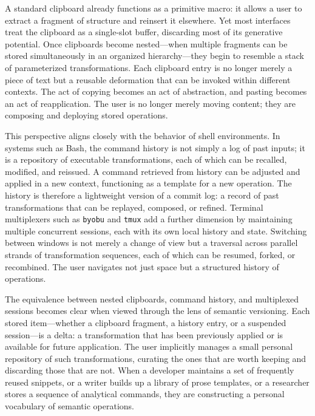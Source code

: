 \documentclass[12pt, letterpaper]{article}
\begin{document}
A standard clipboard already functions as a primitive macro: it allows a user to extract a fragment of structure and reinsert it elsewhere. Yet most interfaces treat the clipboard as a single-slot buffer, discarding most of its generative potential. Once clipboards become nested---when multiple fragments can be stored simultaneously in an organized hierarchy---they begin to resemble a stack of parameterized transformations. Each clipboard entry is no longer merely a piece of text but a reusable deformation that can be invoked within different contexts. The act of copying becomes an act of abstraction, and pasting becomes an act of reapplication. The user is no longer merely moving content; they are composing and deploying stored operations.

This perspective aligns closely with the behavior of shell environments. In systems such as Bash, the command history is not simply a log of past inputs; it is a repository of executable transformations, each of which can be recalled, modified, and reissued. A command retrieved from history can be adjusted and applied in a new context, functioning as a template for a new operation. The history is therefore a lightweight version of a commit log: a record of past transformations that can be replayed, composed, or refined. Terminal multiplexers such as \texttt{byobu} and \texttt{tmux} add a further dimension by maintaining multiple concurrent sessions, each with its own local history and state. Switching between windows is not merely a change of view but a traversal across parallel strands of transformation sequences, each of which can be resumed, forked, or recombined. The user navigates not just space but a structured history of operations.

The equivalence between nested clipboards, command history, and multiplexed sessions becomes clear when viewed through the lens of semantic versioning. Each stored item---whether a clipboard fragment, a history entry, or a suspended session---is a delta: a transformation that has been previously applied or is available for future application. The user implicitly manages a small personal repository of such transformations, curating the ones that are worth keeping and discarding those that are not. When a developer maintains a set of frequently reused snippets, or a writer builds up a library of prose templates, or a researcher stores a sequence of analytical commands, they are constructing a personal vocabulary of semantic operations.
\end{document}
